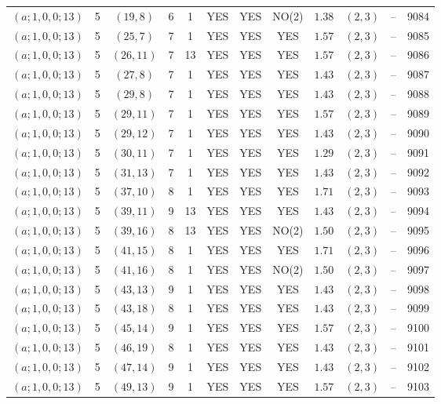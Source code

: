 \begin{longtable}{|c|c|c|c|c|c|c|c|c|c|c|c|}
$(a;1,0,0;13)$ & 5 & $(19,8)$ & 6 & 1 & YES & YES & NO(2) & $1.38$ & $(2,3)$ & -- & 9084\\
$(a;1,0,0;13)$ & 5 & $(25,7)$ & 7 & 1 & YES & YES & YES & $1.57$ & $(2,3)$ & -- & 9085\\
$(a;1,0,0;13)$ & 5 & $(26,11)$ & 7 & 13 & YES & YES & YES & $1.57$ & $(2,3)$ & -- & 9086\\
$(a;1,0,0;13)$ & 5 & $(27,8)$ & 7 & 1 & YES & YES & YES & $1.43$ & $(2,3)$ & -- & 9087\\
$(a;1,0,0;13)$ & 5 & $(29,8)$ & 7 & 1 & YES & YES & YES & $1.43$ & $(2,3)$ & -- & 9088\\
$(a;1,0,0;13)$ & 5 & $(29,11)$ & 7 & 1 & YES & YES & YES & $1.57$ & $(2,3)$ & -- & 9089\\
$(a;1,0,0;13)$ & 5 & $(29,12)$ & 7 & 1 & YES & YES & YES & $1.43$ & $(2,3)$ & -- & 9090\\
$(a;1,0,0;13)$ & 5 & $(30,11)$ & 7 & 1 & YES & YES & YES & $1.29$ & $(2,3)$ & -- & 9091\\
$(a;1,0,0;13)$ & 5 & $(31,13)$ & 7 & 1 & YES & YES & YES & $1.43$ & $(2,3)$ & -- & 9092\\
$(a;1,0,0;13)$ & 5 & $(37,10)$ & 8 & 1 & YES & YES & YES & $1.71$ & $(2,3)$ & -- & 9093\\
$(a;1,0,0;13)$ & 5 & $(39,11)$ & 9 & 13 & YES & YES & YES & $1.43$ & $(2,3)$ & -- & 9094\\
$(a;1,0,0;13)$ & 5 & $(39,16)$ & 8 & 13 & YES & YES & NO(2) & $1.50$ & $(2,3)$ & -- & 9095\\
$(a;1,0,0;13)$ & 5 & $(41,15)$ & 8 & 1 & YES & YES & YES & $1.71$ & $(2,3)$ & -- & 9096\\
$(a;1,0,0;13)$ & 5 & $(41,16)$ & 8 & 1 & YES & YES & NO(2) & $1.50$ & $(2,3)$ & -- & 9097\\
$(a;1,0,0;13)$ & 5 & $(43,13)$ & 9 & 1 & YES & YES & YES & $1.43$ & $(2,3)$ & -- & 9098\\
$(a;1,0,0;13)$ & 5 & $(43,18)$ & 8 & 1 & YES & YES & YES & $1.43$ & $(2,3)$ & -- & 9099\\
$(a;1,0,0;13)$ & 5 & $(45,14)$ & 9 & 1 & YES & YES & YES & $1.57$ & $(2,3)$ & -- & 9100\\
$(a;1,0,0;13)$ & 5 & $(46,19)$ & 8 & 1 & YES & YES & YES & $1.43$ & $(2,3)$ & -- & 9101\\
$(a;1,0,0;13)$ & 5 & $(47,14)$ & 9 & 1 & YES & YES & YES & $1.43$ & $(2,3)$ & -- & 9102\\
$(a;1,0,0;13)$ & 5 & $(49,13)$ & 9 & 1 & YES & YES & YES & $1.57$ & $(2,3)$ & -- & 9103\\

\end{longtable}
